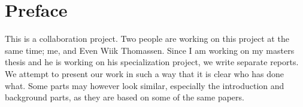 
\section*{Preface}

This is a collaboration project. Two people are working on this
project at the same time; me, and Even Wiik Thomassen. Since I am working
on my masters thesis and he is working on his specialization project, we 
write separate reports. We attempt to present our work in such a way that
it is clear who has done what. Some parts may however look similar,
especially the introduction and background parts, as they are based on 
some of the same papers.


